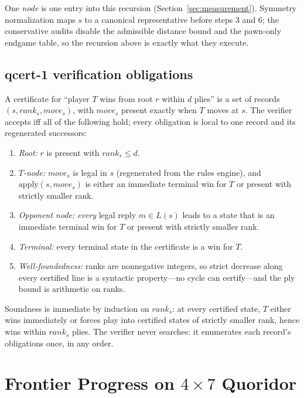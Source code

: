 \documentclass[conference]{IEEEtran}
\begin{document}
One \emph{node} is one entry into this recursion (Section~\ref{sec:measurement}). Symmetry normalization maps $s$ to a canonical representative before steps 3 and 6; the conservative audits disable the admissible distance bound and the pawn-only endgame table, so the recursion above is exactly what they execute.

\subsection{\textsf{qcert-1} verification obligations}

A certificate for ``player $T$ wins from root $r$ within $d$ plies'' is a set of records $(s,\mathit{rank}_s,\mathit{move}_s)$, with $\mathit{move}_s$ present exactly when $T$ moves at $s$. The verifier accepts iff all of the following hold; every obligation is local to one record and its regenerated successors:

\begin{enumerate}[leftmargin=*]
\item \emph{Root:} $r$ is present with $\mathit{rank}_r\leq d$.
\item \emph{$T$-node:} $\mathit{move}_s$ is legal in $s$ (regenerated from the rules engine), and $\mathrm{apply}(s,\mathit{move}_s)$ is either an immediate terminal win for $T$ or present with strictly smaller rank.
\item \emph{Opponent node:} \emph{every} legal reply $m\in L(s)$ leads to a state that is an immediate terminal win for $T$ or present with strictly smaller rank.
\item \emph{Terminal:} every terminal state in the certificate is a win for $T$.
\item \emph{Well-foundedness:} ranks are nonnegative integers, so strict decrease along every certified line is a syntactic property---no cycle can certify---and the ply bound is arithmetic on ranks.
\end{enumerate}

Soundness is immediate by induction on $\mathit{rank}_s$: at every certified state, $T$ either wins immediately or forces play into certified states of strictly smaller rank, hence wins within $\mathit{rank}_s$ plies. The verifier never searches: it enumerates each record's obligations once, in any order.

\section{Frontier Progress on $4\times 7$ Quoridor}
\label{sec:fourseven}
\end{document}
